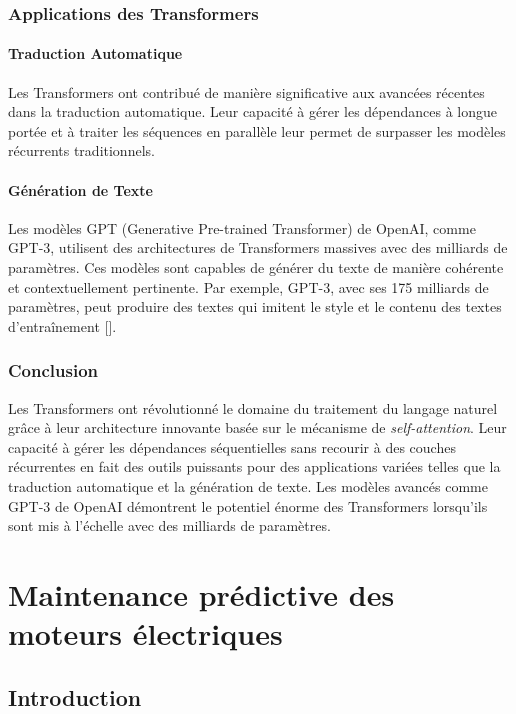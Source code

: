 \subsection{Applications des Transformers}

\subsubsection{Traduction Automatique}

Les Transformers ont contribué de manière significative aux avancées récentes
dans la traduction automatique. Leur capacité à gérer les dépendances à longue
portée et à traiter les séquences en parallèle leur permet de surpasser les
modèles récurrents traditionnels.

\subsubsection{Génération de Texte}

Les modèles GPT (Generative Pre-trained Transformer) de OpenAI, comme GPT-3,
utilisent des architectures de Transformers massives avec des milliards de
paramètres. Ces modèles sont capables de générer du texte de manière cohérente
et contextuellement pertinente. Par exemple, GPT-3, avec ses 175 milliards de
paramètres, peut produire des textes qui imitent le style et le contenu des
textes d'entraînement [\cite{brown2020language}].

\subsection{Conclusion}

Les Transformers ont révolutionné le domaine du traitement du langage naturel
grâce à leur architecture innovante basée sur le mécanisme de
\textit{self-attention}. Leur capacité à gérer les dépendances séquentielles
sans recourir à des couches récurrentes en fait des outils puissants pour des
applications variées telles que la traduction automatique et la génération de
texte. Les modèles avancés comme GPT-3 de OpenAI démontrent le potentiel énorme
des Transformers lorsqu’ils sont mis à l’échelle avec des milliards de
paramètres.

\chapter{Maintenance prédictive des moteurs électriques}
\section{Introduction}

